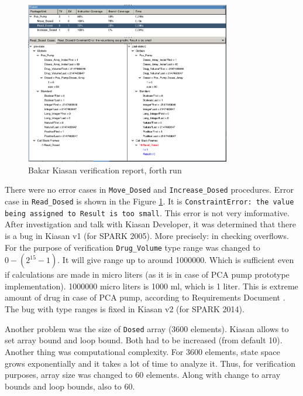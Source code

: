 \begin{figure}[ht]%
    \begin{center}
        \includegraphics[width=0.8\textwidth]{figures/pca-pump-verification-step4.png}
    \end{center}
    \caption{Bakar Kiasan verification report, forth run}
    \label{figure:sparkverification:kiasanreport4}
\end{figure}

There were no error cases in \lstinline{Move_Dosed} and \lstinline{Increase_Dosed} procedures. Error case in \lstinline{Read_Dosed} is shown in the Figure \ref{figure:sparkverification:kiasanreport4}. It is \lstinline{ConstraintError: the value being assigned to Result is too small}. This error is not very imformative. After investigation and talk with Kiasan Developer, it was determined that there is a bug in Kiasan v1 (for SPARK 2005). More precisely: in checking overflows. For the purpose of verification \lstinline{Drug_Volume} type range was changed to $0 - (2^{15} - 1)$. It will give range up to around 1000000. Which is sufficient even if calculations are made in micro liters (as it is in case of PCA pump prototype implementation). 1000000 micro liters is 1000 ml, which is 1 liter. This is extreme amount of drug in case of PCA pump, according to Requirements Document \cite{PcaReq}. The bug with type ranges is fixed in Kiasan v2 (for SPARK 2014).

Another problem was the size of \lstinline{Dosed} array (3600 elements). Kiasan allows to set array bound and loop bound. Both had to be increased (from default 10). Another thing was computational complexity. For 3600 elements, state space grows exponentially and it takes a lot of time to analyze it. Thus, for verification purposes, array size was changed to 60 elements. Along with change to array bounds and loop bounds, also to 60.

